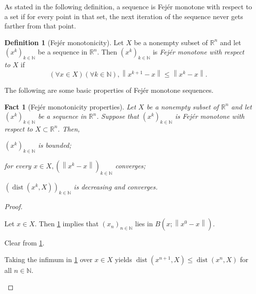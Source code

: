 \documentclass[smallextended,numbook,nospthms]{svjour3}
\theoremstyle{plain}
\newtheorem{fact}[theorem]{Fact}
\theoremstyle{definition}
\newtheorem{definition}[theorem]{Definition}
\def\RR{\mathds R}
\def\NN{\mathds N}
\DeclareMathOperator{\dist}{dist}
\begin{document}
As stated in the following definition, a sequence is Fejér monotone with respect to a set if for every point in that set, the next iteration of the sequence never gets farther from that point.
\begin{definition}[Fejér monotonicity]\label{def:Fejer}
	Let $X$ be a nonempty subset of $\RR^{n}$ and let $\left(x^{k}\right)_{k \in \NN}$ be a sequence in $\RR^{n}$. Then $\left(x^{k}\right)_{k \in \NN}$ is \emph{Fejér monotone with respect to $X$} if
	$$
	(\forall x \in X)(\forall k \in \NN), \left\|x^{k+1}-x\right\| \leq\left\|x^{k}-x\right\|.
	$$
\end{definition}
The following are some basic properties of Fejér monotone sequences.
\begin{fact}[Fejér monotonicity properties]\label{fact:Fejer prop} Let $X$ be a nonempty subset of $\RR^{n}$ and let $\left(x^{k}\right)_{k \in \NN}$ be a sequence in $\RR^{n}$. Suppose that $\left(x^{k}\right)_{k \in \NN}$ is Fejér monotone with respect to $X\subset \RR^{n}$. Then,
\begin{listi}
	\item $\left(x^{k}\right)_{k \in \NN}$ is bounded;
	\item  for every $x \in X,\left(\left\|x^{k}-x\right\|\right)_{k \in\NN}$ converges;
	\item  $\left(\dist\left(x^{k}, X\right)\right)_{k \in \NN}$ is decreasing and converges.
\end{listi}
\end{fact}
\begin{proof}
\begin{listi}
    \item Let $x \in X$. Then \cref{def:Fejer} implies that $\left(x_{n}\right)_{n \in \NN}$ lies in $B\left(x ;\left\|x^{0}-x\right\|\right)$.
    \item Clear from \cref{def:Fejer}.
    \item Taking the infimum in \cref{def:Fejer} over $x \in X$ yields $\dist(x^{n+1}, X) \leq \dist(x^{n}, X)$ for all $n \in \NN$.
\end{listi}
\end{proof}
\end{document}
